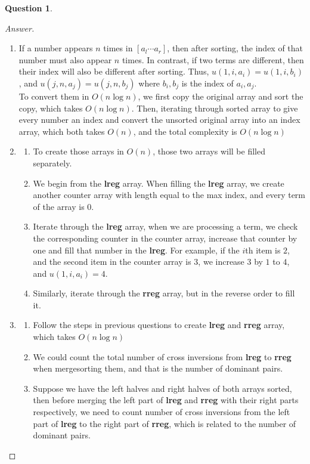 \documentclass{article}
\theoremstyle{plain}
\newtheorem{question}{Question}
\newenvironment{answer}[1][Answer]
    {\begin{proof}[#1]{$ $}\renewcommand\qedsymbol{$\vartriangle$}}
    {\end{proof}}
\begin{document}
\begin{question}
\end{question}
\begin{answer}
    \begin{enumerate}
        \item
        If a number appears $n$ times in $[a_l \cdots a_r]$, then after sorting, the index of that number must also appear $n$ times. In contrast, if two terms are different, then their index will also be different after sorting. Thus, $u(1, i, a_i) = u(1, i, b_i)$, and $u(j, n, a_j) = u(j, n, b_j)$ where $b_i, b_j$ is the index of $a_i, a_j$. \\

        To convert them in $O(n\log n)$, we first copy the original array and sort the copy, which takes $O(n\log n)$. Then, iterating through sorted array to give every number an index and convert the unsorted original array into an index array, which both takes $O(n)$, and the total complexity is $O(n\log n)$
        \item
        \begin{enumerate}
            \item
            To create those arrays in $O(n)$, those two arrays will be filled separately.
            \item
            We begin from the \textbf{lreg} array. When filling the \textbf{lreg} array, we create another counter array with length equal to the max index, and every term of the array is $0$.
            \item
            Iterate through the \textbf{lreg} array, when we are processing a term, we check the corresponding counter in the counter array, increase that counter by one and fill that number in the \textbf{lreg}. For example, if the $i$th item is $2$, and the second item in the counter array is $3$, we increase $3$ by $1$ to $4$, and $u(1, i, a_i) = 4$.
            \item
            Similarly, iterate through the \textbf{rreg} array, but in the reverse order to fill it.
        \end{enumerate}
        \item
        \begin{enumerate}
            \item
            Follow the steps in previous questions to create \textbf{lreg} and \textbf{rreg} array, which takes $O(n\log n)$
            \item
            We could count the total number of cross inversions from \textbf{lreg} to \textbf{rreg} when mergesorting them, and that is the number of dominant pairs.
            \item
            Suppose we have the left halves and right halves of both arrays sorted, then before merging the left part of \textbf{lreg} and \textbf{rreg} with their right parts respectively, we need to count number of cross inversions from the left part of \textbf{lreg} to the right part of \textbf{rreg}, which is related to the number of dominant pairs. \\


\end{enumerate}
\end{enumerate}
\end{answer}
\end{document}
